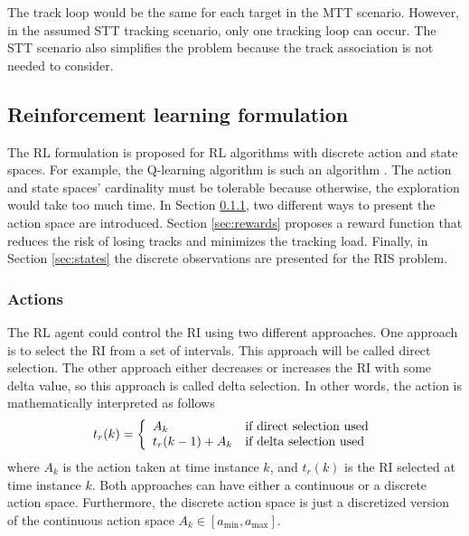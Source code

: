 \documentclass[english, 12pt, a4paper, elec, utf8, a-1b, online]{aaltothesis}
\newcommand{\amax}{a_\text{max}}
\newcommand{\amin}{a_\text{min}}
\newcommand{\ri}{t_r}
\begin{document}
The track loop would be the same for each target in the MTT scenario. 
However, in the assumed STT tracking scenario, only one tracking loop can occur. 
The STT scenario also simplifies the problem because the track association is not needed to consider.


\subsection{Reinforcement learning formulation}\label{sec:RL_formulation}

The RL formulation is proposed for RL algorithms with discrete action and state spaces.
For example, the Q-learning algorithm is such an algorithm \cite{Sutton2018}. 
The action and state spaces' cardinality must be tolerable because otherwise, the exploration would take too much time.
In Section \ref{sec:actions}, two different ways to present the action space are introduced.
Section \ref{sec:rewards} proposes a reward function that reduces the risk of losing tracks and minimizes the tracking load. 
Finally, in Section \ref{sec:states} the discrete observations are presented for the RIS problem.

\subsubsection{Actions} \label{sec:actions}

The RL agent could control the RI using two different approaches.
One approach is to select the RI from a set of intervals.
This approach will be called direct selection.
The other approach either decreases or increases the RI with some delta value, so this approach is called delta selection.
In other words, the action is mathematically interpreted as follows
\begin{equation}
    \ri(k) = \left\{
        \begin{array}{l l}
            A_k & \text{if direct selection used} \\
            \ri(k-1) + A_k &  \text{if delta selection used}
        \end{array}\right.
\end{equation}
where $A_k$ is the action taken at time instance $k$, and $\ri(k)$ is the RI selected at time instance $k$.
Both approaches can have either a continuous or a discrete action space.
Furthermore, the discrete action space is just a discretized version of the continuous action space $A_k \in [\amin, \amax]$.
\end{document}
